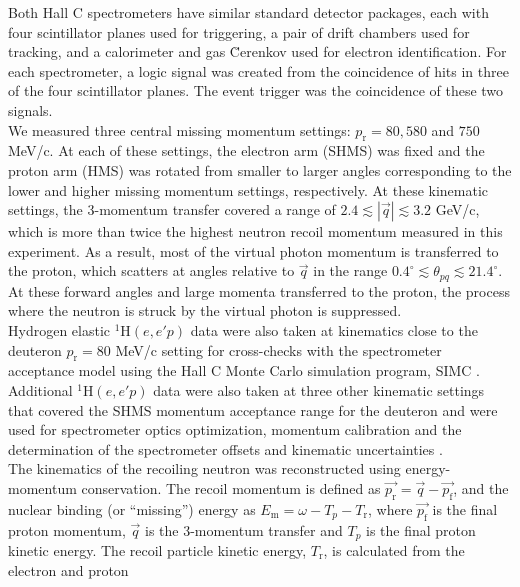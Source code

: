 \documentclass[aps,prl,twocolumn,showpacs,superscriptaddress,groupedaddress,nofootinbib]{revtex4-2}  %
\begin{document}
\indent Both Hall C spectrometers have similar standard detector packages, each with four scintillator planes \cite{hodo_techreport} used for triggering, a pair of drift chambers \cite{dc_techreport} used for tracking, and a calorimeter \cite{Mkrtchyan_2013} and gas \u{C}erenkov \cite{Li_Wenliang_mthesis,ngc_techreport} used for electron identification.
For each spectrometer, a logic signal was created from  the coincidence of hits in three of the four scintillator planes. The event trigger was the coincidence of these two signals. \\
\indent We measured three central missing momentum settings: $p_{\mathrm{r}}=80, 580$ and $750$ MeV/c. At each of these settings, the electron arm (SHMS) was fixed and the proton arm (HMS) was rotated from smaller to larger angles corresponding to
the lower and higher missing momentum settings, respectively. At these kinematic settings, the 3-momentum transfer covered a range of $2.4\lesssim|\vec{q}|\lesssim3.2$ GeV/c, which is more than twice the highest neutron recoil momentum
measured in this experiment. As a result, most of the virtual photon momentum is transferred to the proton, which scatters at angles relative to $\vec{q}$ in the range $0.4^{\circ}\lesssim \theta_{pq}\lesssim21.4^{\circ}$.
At these forward angles and large momenta transferred to the proton, the  process where the neutron is struck by the virtual photon is suppressed.\\
\indent Hydrogen elastic $^{1}\mathrm{H}(e,e'p)$ data were also taken at kinematics close to the deuteron $p_{\mathrm{r}}=80$ MeV/c setting for cross-checks with the spectrometer acceptance model using the  Hall C Monte Carlo
simulation program, SIMC \cite{PhysRevC.64.054610}. Additional $^{1}\mathrm{H}(e,e'p)$ data were also taken at three other kinematic settings that covered the SHMS momentum acceptance range for the deuteron and were used for spectrometer optics optimization, 
momentum calibration and the determination of the spectrometer offsets and kinematic uncertainties \cite{cyero_phdthesis}.\\
\indent The kinematics of the recoiling neutron was reconstructed using energy-momentum conservation. The recoil momentum is defined as $\vec{p_{\mathrm{r}}} = \vec{q} - \vec{p_{\mathrm{f}}}$,
and the nuclear binding (or ``missing'') energy as $E_{\mathrm{m}} = \omega - T_{p} - T_{\mathrm{r}}$, where $\vec{p_{\mathrm{f}}}$ is the final proton momentum, $\vec{q}$ is the
3-momentum transfer and $T_{p}$ is the final proton kinetic energy. The recoil particle kinetic energy, $T_{\mathrm{r}}$, is calculated from the electron and proton
\end{document}

